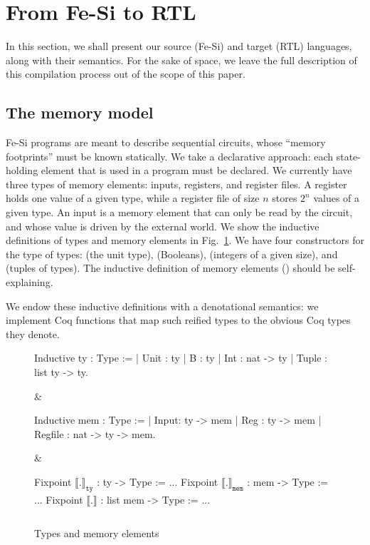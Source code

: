 \documentclass{llncs}
\newcommand{\denote}[1]{\llbracket #1 \rrbracket}
\newcommand{\denotety}[1]{\denote{\mathtt{#1}}_{\mathtt{ty}}}
\newcommand{\denotemem}[1]{\denote{\mathtt{#1}}_{\mathtt{mem}}}
\begin{document}
\section{From Fe-Si to RTL}

In this section, we shall present our source (Fe-Si) and target (RTL)
languages, along with their semantics. For the sake of space, we leave
the full description of this compilation process out of the scope of
this paper.

\subsection{The memory model}
Fe-Si programs are meant to describe sequential circuits, whose
``memory footprints'' must be known statically. We take a declarative
approach: each state-holding element that is used in a program must be
declared. 
%
We currently have three types of memory elements: inputs, registers,
and register files. A register holds one value of a given type, while a
register file of size $n$ stores $2^n$ values of a given type. 
%
An input is a memory element that can only be read by the circuit,
and whose value is driven by the external world.
%
We show the inductive definitions of types and memory elements in
Fig.~\ref{fig:type}. 
%
We have four constructors for the type  of types: 
(the unit type),  (Booleans),  (integers of a given
size), and  (tuples of types). The inductive definition of
memory elements () should be self-explaining. 

We endow these inductive definitions with a denotational semantics: we
implement Coq functions that map such reified types to the obvious Coq
types they denote.

\begin{figure}
  \centering
\begin{threelistings}
\begin{coq}
Inductive ty : Type :=
| Unit : ty 
| B : ty 
| Int : nat -> ty
| Tuple : list ty -> ty.     
\end{coq}&
\begin{coq}
Inductive mem : Type :=
| Input: ty ->  mem
| Reg : ty -> mem
| Regfile : nat -> ty -> mem. 
$ $
\end{coq}
&
\begin{coq}
Fixpoint $\denotety{.}$ : ty -> Type := ...
Fixpoint $\denotemem{.}$ : mem -> Type := ...
Fixpoint $\denote{.}$ : list mem -> Type := ...

$ $
\end{coq}
\end{threelistings}
\caption{Types and memory elements}
  \label{fig:type}
\end{figure}
\end{document}
